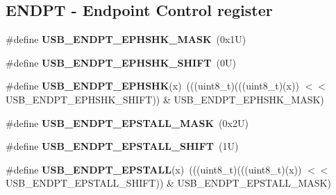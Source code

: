 \subsection*{E\+N\+D\+PT -\/ Endpoint Control register}
\begin{DoxyCompactItemize}
\item 
\mbox{\label{group___u_s_b___register___masks_ga9266b40af26177a6659041e0229e76e7}} 
\#define {\bfseries U\+S\+B\+\_\+\+E\+N\+D\+P\+T\+\_\+\+E\+P\+H\+S\+H\+K\+\_\+\+M\+A\+SK}~(0x1\+U)
\item 
\mbox{\label{group___u_s_b___register___masks_ga477c6b1ea91137b6ebd65d0574a7b611}} 
\#define {\bfseries U\+S\+B\+\_\+\+E\+N\+D\+P\+T\+\_\+\+E\+P\+H\+S\+H\+K\+\_\+\+S\+H\+I\+FT}~(0\+U)
\item 
\mbox{\label{group___u_s_b___register___masks_ga25141556db24bfad0ff1a5636629993f}} 
\#define {\bfseries U\+S\+B\+\_\+\+E\+N\+D\+P\+T\+\_\+\+E\+P\+H\+S\+HK}(x)~(((uint8\+\_\+t)(((uint8\+\_\+t)(x)) $<$$<$ U\+S\+B\+\_\+\+E\+N\+D\+P\+T\+\_\+\+E\+P\+H\+S\+H\+K\+\_\+\+S\+H\+I\+FT)) \& U\+S\+B\+\_\+\+E\+N\+D\+P\+T\+\_\+\+E\+P\+H\+S\+H\+K\+\_\+\+M\+A\+SK)
\item 
\mbox{\label{group___u_s_b___register___masks_ga57a65ef14a5d868dcd964177fe6daad2}} 
\#define {\bfseries U\+S\+B\+\_\+\+E\+N\+D\+P\+T\+\_\+\+E\+P\+S\+T\+A\+L\+L\+\_\+\+M\+A\+SK}~(0x2\+U)
\item 
\mbox{\label{group___u_s_b___register___masks_ga38af6f0d87e04be4f9f19cca981765cb}} 
\#define {\bfseries U\+S\+B\+\_\+\+E\+N\+D\+P\+T\+\_\+\+E\+P\+S\+T\+A\+L\+L\+\_\+\+S\+H\+I\+FT}~(1\+U)
\item 
\mbox{\label{group___u_s_b___register___masks_ga945b97861d1e8a812ef88c98c308e0f1}} 
\#define {\bfseries U\+S\+B\+\_\+\+E\+N\+D\+P\+T\+\_\+\+E\+P\+S\+T\+A\+LL}(x)~(((uint8\+\_\+t)(((uint8\+\_\+t)(x)) $<$$<$ U\+S\+B\+\_\+\+E\+N\+D\+P\+T\+\_\+\+E\+P\+S\+T\+A\+L\+L\+\_\+\+S\+H\+I\+FT)) \& U\+S\+B\+\_\+\+E\+N\+D\+P\+T\+\_\+\+E\+P\+S\+T\+A\+L\+L\+\_\+\+M\+A\+SK)
\item 
\mbox{\label{group___u_s_b___register___masks_ga3d498f31497071c5ff6ad30e89b7c26e}} 

\end{DoxyCompactItemize}
